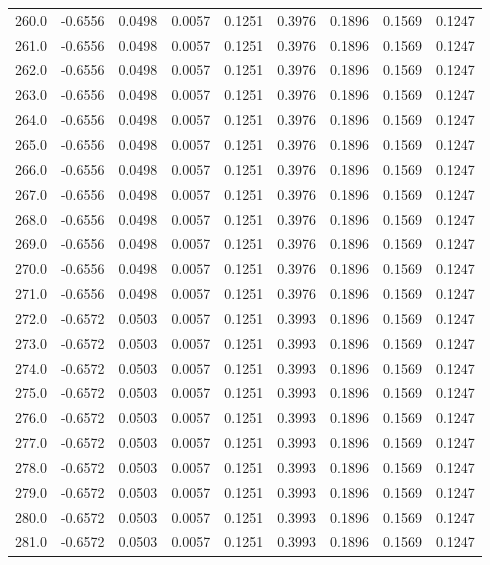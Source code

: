 \begin{longtable}{lrrrrrrrr}
260.0 & -0.6556 & 0.0498 & 0.0057 & 0.1251 & 0.3976 & 0.1896 & 0.1569 & 0.1247 \\
261.0 & -0.6556 & 0.0498 & 0.0057 & 0.1251 & 0.3976 & 0.1896 & 0.1569 & 0.1247 \\
262.0 & -0.6556 & 0.0498 & 0.0057 & 0.1251 & 0.3976 & 0.1896 & 0.1569 & 0.1247 \\
263.0 & -0.6556 & 0.0498 & 0.0057 & 0.1251 & 0.3976 & 0.1896 & 0.1569 & 0.1247 \\
264.0 & -0.6556 & 0.0498 & 0.0057 & 0.1251 & 0.3976 & 0.1896 & 0.1569 & 0.1247 \\
265.0 & -0.6556 & 0.0498 & 0.0057 & 0.1251 & 0.3976 & 0.1896 & 0.1569 & 0.1247 \\
266.0 & -0.6556 & 0.0498 & 0.0057 & 0.1251 & 0.3976 & 0.1896 & 0.1569 & 0.1247 \\
267.0 & -0.6556 & 0.0498 & 0.0057 & 0.1251 & 0.3976 & 0.1896 & 0.1569 & 0.1247 \\
268.0 & -0.6556 & 0.0498 & 0.0057 & 0.1251 & 0.3976 & 0.1896 & 0.1569 & 0.1247 \\
269.0 & -0.6556 & 0.0498 & 0.0057 & 0.1251 & 0.3976 & 0.1896 & 0.1569 & 0.1247 \\
270.0 & -0.6556 & 0.0498 & 0.0057 & 0.1251 & 0.3976 & 0.1896 & 0.1569 & 0.1247 \\
271.0 & -0.6556 & 0.0498 & 0.0057 & 0.1251 & 0.3976 & 0.1896 & 0.1569 & 0.1247 \\
272.0 & -0.6572 & 0.0503 & 0.0057 & 0.1251 & 0.3993 & 0.1896 & 0.1569 & 0.1247 \\
273.0 & -0.6572 & 0.0503 & 0.0057 & 0.1251 & 0.3993 & 0.1896 & 0.1569 & 0.1247 \\
274.0 & -0.6572 & 0.0503 & 0.0057 & 0.1251 & 0.3993 & 0.1896 & 0.1569 & 0.1247 \\
275.0 & -0.6572 & 0.0503 & 0.0057 & 0.1251 & 0.3993 & 0.1896 & 0.1569 & 0.1247 \\
276.0 & -0.6572 & 0.0503 & 0.0057 & 0.1251 & 0.3993 & 0.1896 & 0.1569 & 0.1247 \\
277.0 & -0.6572 & 0.0503 & 0.0057 & 0.1251 & 0.3993 & 0.1896 & 0.1569 & 0.1247 \\
278.0 & -0.6572 & 0.0503 & 0.0057 & 0.1251 & 0.3993 & 0.1896 & 0.1569 & 0.1247 \\
279.0 & -0.6572 & 0.0503 & 0.0057 & 0.1251 & 0.3993 & 0.1896 & 0.1569 & 0.1247 \\
280.0 & -0.6572 & 0.0503 & 0.0057 & 0.1251 & 0.3993 & 0.1896 & 0.1569 & 0.1247 \\
281.0 & -0.6572 & 0.0503 & 0.0057 & 0.1251 & 0.3993 & 0.1896 & 0.1569 & 0.1247 \\

\end{longtable}
